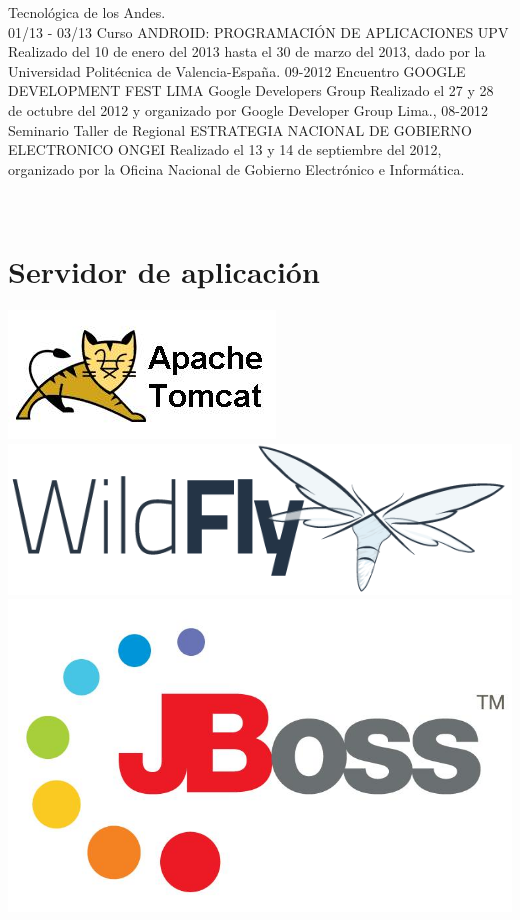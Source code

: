 \documentclass[]{friggeri-cv}
\begin{document}
\begin{entrylist}
{    Tecnol\'ogica de los Andes.\\}
    \entry
    {01/13 - 03/13}
    {Curso ANDROID{:} PROGRAMACI\'ON DE APLICACIONES}
    {UPV}
    {Realizado del 10 de enero del 2013 hasta el 30 de marzo del 2013, dado por
    la Universidad Polit\'ecnica de Valencia-Espa\~na.}
    \entry
    {09-2012}
    {Encuentro GOOGLE DEVELOPMENT FEST LIMA}
    {Google Developers Group}
    {Realizado el 27 y 28 de octubre del 2012 y organizado por Google Developer Group Lima.},
    \entry
    {08-2012}
    {Seminario Taller de Regional ESTRATEGIA NACIONAL DE GOBIERNO ELECTRONICO}
    {ONGEI}
    {Realizado el 13 y 14 de septiembre del 2012, organizado por la Oficina
    Nacional de Gobierno Electr\'onico e Inform\'atica.}
\end{entrylist}
\begin{aside}
    ~
    ~
    \section{Servidor de aplicaci\'on}
    \includegraphics[scale=0.40]{img/tomcat}
    \includegraphics[scale=0.15]{img/wildfly}
    \includegraphics[scale=0.15]{img/jboss}
    ~

\end{aside}
\end{document}
